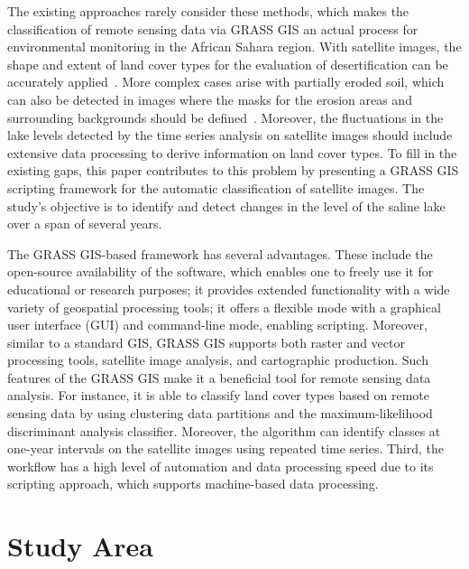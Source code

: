 \documentclass[asi,article,accept,pdftex,moreauthors]{Definitions/mdpi}
\begin{document}
The existing approaches rarely consider these methods, which makes the classification of remote sensing data {via GRASS GIS }an actual process for environmental monitoring in the African Sahara region. With satellite images, the shape and extent of land cover types for the evaluation of desertification can be accurately applied~\cite{oussedik2003realisation}. More complex cases arise with partially eroded soil, which can also be detected in images where the masks for the erosion areas and surrounding backgrounds should be defined~\cite{Toumietal}. {Moreover, the} fluctuations in the lake levels detected by the time series analysis {on} satellite images should include extensive data processing to derive information on land cover types. {To fill in the existing gaps}, this paper contributes to this problem by presenting a GRASS GIS scripting framework for the automatic classification of satellite images. {The study's objective is }to identify {and detect }changes in the {level of the saline }lake over a span of several years.

{The GRASS GIS-based framework has several advantages. These include the open-source availability of the software, which enables one to freely use it for educational or research purposes; it provides extended functionality with a wide variety of geospatial processing tools; it offers a flexible mode with a  graphical user interface (GUI) and command-line mode, enabling scripting. Moreover, similar to a standard GIS, GRASS GIS supports both raster and vector processing tools, satellite image analysis, and cartographic production. Such features of the GRASS GIS make it a beneficial tool for remote sensing data analysis. For instance}, it is able to classify land cover types {based on remote sensing data }by using clustering data partitions and the maximum-likelihood discriminant analysis classifier. {Moreover}, the algorithm can identify classes at one-year intervals on the {satellite }images using repeated time series. Third, the workflow has a {high level of automation} and data processing speed due to its scripting {approach, which supports machine-based data processing}.

\section{Study Area}
\end{document}
